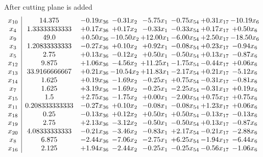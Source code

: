\documentclass[8pt]{article}
\begin{document}
 After cutting plane is added 
\[\begin{array}{c| c c@{\hskip 2pt} c@{\hskip 2pt} c@{\hskip 2pt} c@{\hskip 2pt} c@{\hskip 2pt} c@{\hskip 2pt} }
 x_{10}   &  14.375 & -0.19 x_{36} & -0.31 x_{2} & -5.75 x_{1} & -0.75 x_{54} & +  0.31 x_{17} & -10.19 x_{6}\\
 x_{4}   &  1.33333333333 & +  0.17 x_{36} & +  0.17 x_{2} & -0.33 x_{1} & -0.33 x_{54} & +  0.17 x_{17} & +  0.50 x_{6}\\
 x_{9}   &  49.0 & +  0.50 x_{36} & -10.50 x_{2} & + 12.00 x_{1} & -6.00 x_{54} & +  2.50 x_{17} & -18.50 x_{6}\\
 x_{3}   &  1.20833333333 & -0.27 x_{36} & +  0.10 x_{2} & +  0.92 x_{1} & -0.08 x_{54} & +  0.23 x_{17} & -0.94 x_{6}\\
 x_{5}   &  2.75 & +  0.13 x_{36} & -0.12 x_{2} & +  0.50 x_{1} & -0.50 x_{54} & +  0.13 x_{17} & -0.87 x_{6}\\
 x_{12}   &  9.875 & +  1.06 x_{36} & -4.56 x_{2} & + 11.25 x_{1} & -1.75 x_{54} & -0.44 x_{17} & +  0.06 x_{6}\\
 x_{13}   &  33.9166666667 & +  0.21 x_{36} & -10.54 x_{2} & + 11.83 x_{1} & -2.17 x_{54} & +  0.21 x_{17} & -5.12 x_{6}\\
 x_{14}   &  1.625 & +  0.19 x_{36} & -1.69 x_{2} & -0.25 x_{1} & +  0.75 x_{54} & -0.31 x_{17} & -0.81 x_{6}\\
 x_{7}   &  1.625 & +  3.19 x_{36} & -1.69 x_{2} & -0.25 x_{1} & -2.25 x_{54} & -0.31 x_{17} & +  0.19 x_{6}\\
 x_{15}   &  1.5 & +  2.75 x_{36} & -1.75 x_{2} & +  0.00 x_{1} & -2.00 x_{54} & +  0.75 x_{17} & +  0.75 x_{6}\\
 x_{11}   &  0.208333333333 & -0.27 x_{36} & +  0.10 x_{2} & -0.08 x_{1} & -0.08 x_{54} & +  1.23 x_{17} & +  0.06 x_{6}\\
 x_{18}   &  0.25 & -0.13 x_{36} & +  0.12 x_{2} & +  0.50 x_{1} & +  0.50 x_{54} & -0.13 x_{17} & -0.13 x_{6}\\
 x_{19}   &  2.75 & +  2.13 x_{36} & -3.12 x_{2} & -0.50 x_{1} & -0.50 x_{54} & +  0.13 x_{17} & -0.87 x_{6}\\
 x_{20}   &  4.08333333333 & -0.21 x_{36} & -3.46 x_{2} & -0.83 x_{1} & +  2.17 x_{54} & -0.21 x_{17} & -2.88 x_{6}\\
 x_{8}   &  6.875 & -2.44 x_{36} & -7.06 x_{2} & -2.75 x_{1} & +  6.25 x_{54} & -1.94 x_{17} & -6.44 x_{6}\\
 x_{16}   &  2.125 & +  1.94 x_{36} & -2.44 x_{2} & -0.25 x_{1} & -0.25 x_{54} & -0.56 x_{17} & -1.06 x_{6}\\

\end{array}\]
\end{document}
